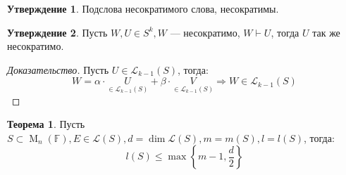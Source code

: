 \documentclass[a4paper, 14pt]{extarticle}
\theoremstyle{definition}
\newtheorem{theorem}{Теорема}
\newtheorem{state}{Утверждение}
\begin{document}
\begin{state}
	Подслова несократимого слова, несократимы.
\end{state}

\begin{state}\label{st7_1}
	Пусть \(W, U \in S^k, W\) --- несократимо, \(W \vdash U\), тогда \(U\) так же несократимо.
\end{state}

\begin{proof}[Доказательство]
	Пусть \(U \in \mathcal{L}_{k - 1}(S)\), тогда: \[W = \alpha \cdot \underset{\in \mathcal{L}_{k - 1}(S)}{U} + \beta \cdot \underset{\in \mathcal{L}_{k - 1}(S)}{V} \Rightarrow W \in \mathcal{L}_{k - 1}(S)\]
\end{proof}

\begin{theorem}\label{st7_2}
	Пусть \(S \subset \operatorname{M}_n(\mathbb{F}), E \in \mathcal{L}(S), d = \operatorname{dim} \mathcal{L}(S), m = m(S), l = l(S)\), тогда:
	\[l(S) \leqslant \operatorname{max} \left\{m - 1, \frac{d}{2}\right\}\]
\end{theorem}
\end{document}
